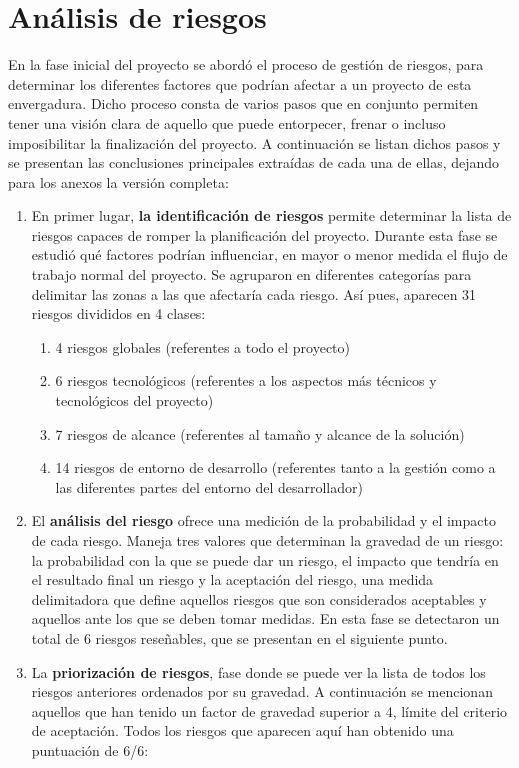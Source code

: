 \section{Análisis de riesgos}
En la fase inicial del proyecto se abordó el proceso de gestión de riesgos, para determinar los diferentes factores que podrían afectar a un proyecto de esta envergadura. Dicho proceso consta de varios pasos que en conjunto permiten tener una visión clara de aquello que puede entorpecer, frenar o incluso imposibilitar la finalización del proyecto. A continuación se listan dichos pasos y se presentan las conclusiones principales extraídas de cada una de ellas, dejando para los anexos la versión completa: 
\begin{enumerate}
\item En primer lugar, \textbf{la identificación de riesgos} permite determinar la lista de riesgos capaces de romper la planificación del proyecto. Durante esta fase se estudió qué factores podrían influenciar, en mayor o menor medida el flujo de trabajo normal del proyecto. Se agruparon en diferentes categorías para delimitar las zonas a las que afectaría cada riesgo. Así pues, aparecen 31 riesgos divididos en 4 clases:
\begin{enumerate}
\item 4 riesgos globales (referentes a todo el proyecto)
\item 6 riesgos tecnológicos (referentes a los aspectos más técnicos y tecnológicos del proyecto)
\item 7 riesgos de alcance (referentes al tamaño y alcance de la solución)
\item 14 riesgos de entorno de desarrollo (referentes tanto a la gestión como a las diferentes partes del entorno del desarrollador)
\end{enumerate}
\item El \textbf{análisis del riesgo} ofrece una medición de la probabilidad y el impacto de cada riesgo. Maneja tres valores que determinan la gravedad de un riesgo: la probabilidad con la que se puede dar un riesgo, el impacto que tendría en el resultado final un riesgo y la aceptación del riesgo, una medida delimitadora que define aquellos riesgos que son considerados aceptables y aquellos ante los que se deben tomar medidas. En esta fase se detectaron un total de 6 riesgos reseñables, que se presentan en el siguiente punto.
\item La \textbf{priorización de riesgos}, fase donde se puede ver la lista de todos los riesgos anteriores ordenados por su gravedad. A continuación se mencionan aquellos que han tenido un factor de gravedad superior a 4, límite del criterio de aceptación. Todos los riesgos que aparecen aquí han obtenido una puntuación de 6/6: 

\end{enumerate}
